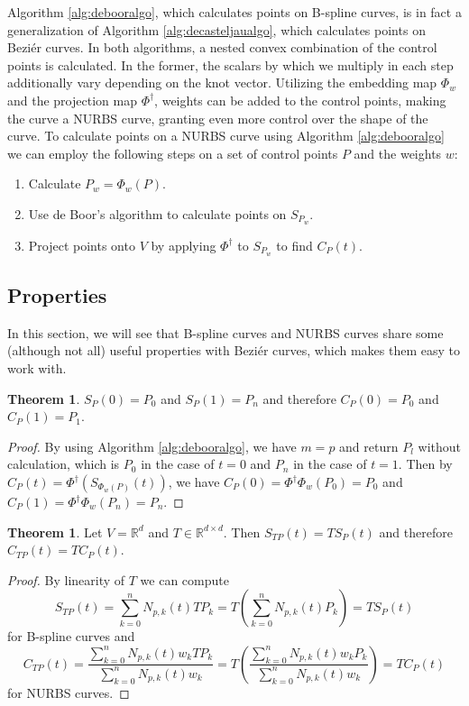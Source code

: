 \documentclass[a4paper, 11pt]{report}
\theoremstyle{definition}
\newtheorem{theorem}[definition]{Theorem}
\begin{document}
Algorithm \ref{alg:debooralgo}, which calculates points on B-spline curves, is in fact a generalization of Algorithm \ref{alg:decasteljaualgo}, which calculates points on Beziér curves. In both algorithms, a nested convex combination of the control points is calculated. In the former, the scalars by which we multiply in each step additionally vary depending on the knot vector. Utilizing the embedding map $\Phi_w$ and the projection map $\Phi^\dagger$, weights can be added to the control points, making the curve a NURBS curve, granting even more control over the shape of the curve. To calculate points on a NURBS curve using Algorithm \ref{alg:debooralgo} we can employ the following steps on a set of control points $P$ and the weights $w$:
\begin{enumerate}
	\item Calculate $P_w = \Phi_w(P)$.
	\item Use de Boor's algorithm to calculate points on $S_{P_w}$.
	\item Project points onto $V$ by applying $\Phi^\dagger$ to $S_{P_w}$ to find $C_P(t)$.
\end{enumerate}

\subsection{Properties}
In this section, we will see that B-spline curves and NURBS curves share some (although not all) useful properties with Beziér curves, which makes them easy to work with.

\begin{theorem}
	$S_P(0) = P_0$ and $S_P(1) = P_n$ and therefore $C_P(0) = P_0$ and $C_P(1) = P_1$.
\end{theorem}
\begin{proof}
	By using Algorithm \ref{alg:debooralgo}, we have $m = p$ and return $P_l$ without calculation, which is $P_0$ in the case of $t = 0$ and $P_n$ in the case of $t = 1$. Then by $C_P(t) = \Phi^\dagger(S_{\Phi_w(P)}(t))$, we have $C_P(0) = \Phi^\dagger\Phi_w(P_0) = P_0$ and $C_P(1) = \Phi^\dagger\Phi_w(P_n) = P_n$.
\end{proof}

\begin{theorem}
	Let $V = \mathbb{R}^d$ and $T \in \mathbb{R}^{d \times d}$. Then $S_{TP}(t) = TS_P(t)$ and therefore $C_{TP}(t) = TC_P(t)$.
\end{theorem}
\begin{proof}
	By linearity of $T$ we can compute
		$$S_{TP}(t) = \sum_{k=0}^{n} N_{p,k}(t) TP_k = T \left( \sum_{k=0}^{n} N_{p,k}(t) P_k \right) = TS_P(t)$$
	for B-spline curves and
		$$C_{TP}(t) = \frac{\sum_{k=0}^n N_{p,k}(t) w_k TP_k}{\sum_{k=0}^n N_{p,k}(t) w_k} = T \left( \frac{\sum_{k=0}^n N_{p,k}(t) w_k P_k}{\sum_{k=0}^n N_{p,k}(t) w_k} \right) = TC_P(t)$$
	for NURBS curves.
\end{proof}
\end{document}
